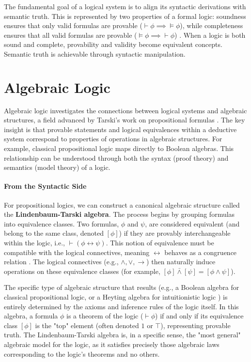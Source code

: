 The fundamental goal of a logical system is to align its syntactic derivations with semantic truth. This is represented by two properties of a formal logic: soundness ensures that only valid formulas are provable ($\vdash \phi \implies \models \phi$), while completeness ensures that all valid formulas are provable ($\models \phi \implies \vdash \phi$) \cite[Lemmas~1.2.7, 1.2.9 and Thm.~1.2.11]{Hajek1998}. When a logic is both sound and complete, provability and validity become equivalent concepts. Semantic truth is achievable through syntactic manipulation.\cite[Thm.~1.2.11]{Hajek1998}


\section{Algebraic Logic}
Algebraic logic investigates the connections between logical systems and algebraic structures, a field advanced by Tarski's work on propositional formulas \cite[p.~1]{BlokPigozzi1989}. The key insight is that provable statements and logical equivalences within a deductive system correspond to properties of operations in algebraic structures. For example, classical propositional logic maps directly to Boolean algebras. This relationship can be understood through both the syntax (proof theory) and semantics (model theory) of a logic.

\paragraph{From the Syntactic Side} For propositional logics, we can construct a canonical algebraic structure called the \textbf{Lindenbaum-Tarski algebra}. The process begins by grouping formulas into equivalence classes. Two formulas, $\phi$ and $\psi$, are considered equivalent (and belong to the same class, denoted $[\phi]$) if they are provably interchangeable within the logic, i.e., $\vdash (\phi \leftrightarrow \psi)$. This notion of equivalence must be compatible with the logical connectives, meaning $\leftrightarrow$ behaves as a congruence relation \cite[p.~1-2]{BlokPigozzi1989}. The logical connectives (e.g., $\wedge, \lor, \rightarrow$) then naturally induce operations on these equivalence classes (for example, $[\phi] \bar{\wedge} [\psi] = [\phi \wedge \psi]$).

The specific type of algebraic structure that results (e.g., a Boolean algebra for classical propositional logic, or a Heyting algebra for intuitionistic logic \cite[Ch.~1]{ResiduatedLattices2007}) is entirely determined by the axioms and inference rules of the logic itself. In this algebra, a formula $\phi$ is a theorem of the logic ($\vdash \phi$) if and only if its equivalence class $[\phi]$ is the "top" element (often denoted $1$ or $\top$), representing provable truth. The Lindenbaum-Tarski algebra is, in a specific sense, the "most general" algebraic model for the logic, as it satisfies precisely those algebraic laws corresponding to the logic's theorems and no others.

